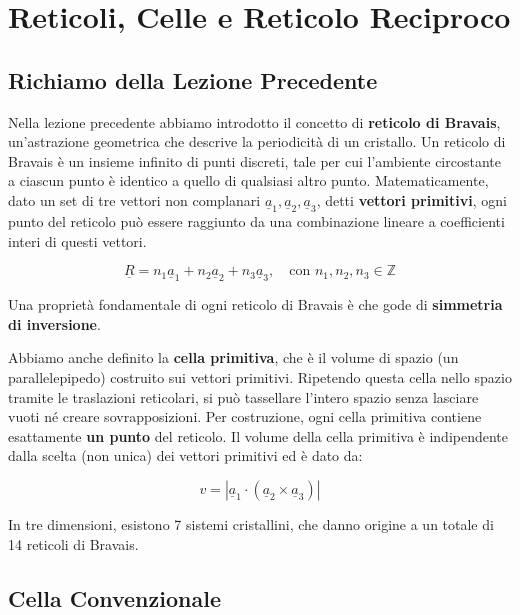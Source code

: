 \section{Reticoli, Celle e Reticolo Reciproco}
\label{appendix:lesson02}

\subsection{Richiamo della Lezione Precedente}

Nella lezione precedente abbiamo introdotto il concetto di \textbf{reticolo di Bravais}, un'astrazione geometrica che descrive la periodicità di un cristallo. Un reticolo di Bravais è un insieme infinito di punti discreti, tale per cui l'ambiente circostante a ciascun punto è identico a quello di qualsiasi altro punto. Matematicamente, dato un set di tre vettori non complanari $\underline{a}_1, \underline{a}_2, \underline{a}_3$, detti \textbf{vettori primitivi}, ogni punto del reticolo può essere raggiunto da una combinazione lineare a coefficienti interi di questi vettori.

\begin{equation}
    \underline{R} = n_1\underline{a}_1 + n_2\underline{a}_2 + n_3\underline{a}_3, \quad \text{con } n_1, n_2, n_3 \in \mathbb{Z}
\end{equation}

Una proprietà fondamentale di ogni reticolo di Bravais è che gode di \textbf{simmetria di inversione}.

Abbiamo anche definito la \textbf{cella primitiva}, che è il volume di spazio (un parallelepipedo) costruito sui vettori primitivi. Ripetendo questa cella nello spazio tramite le traslazioni reticolari, si può tassellare l'intero spazio senza lasciare vuoti né creare sovrapposizioni. Per costruzione, ogni cella primitiva contiene esattamente \textbf{un punto} del reticolo. Il volume della cella primitiva è indipendente dalla scelta (non unica) dei vettori primitivi ed è dato da:

\begin{equation}
    v = |\underline{a}_1 \cdot (\underline{a}_2 \times \underline{a}_3)|
\end{equation}

In tre dimensioni, esistono 7 sistemi cristallini, che danno origine a un totale di 14 reticoli di Bravais.

\subsection{Cella Convenzionale}

